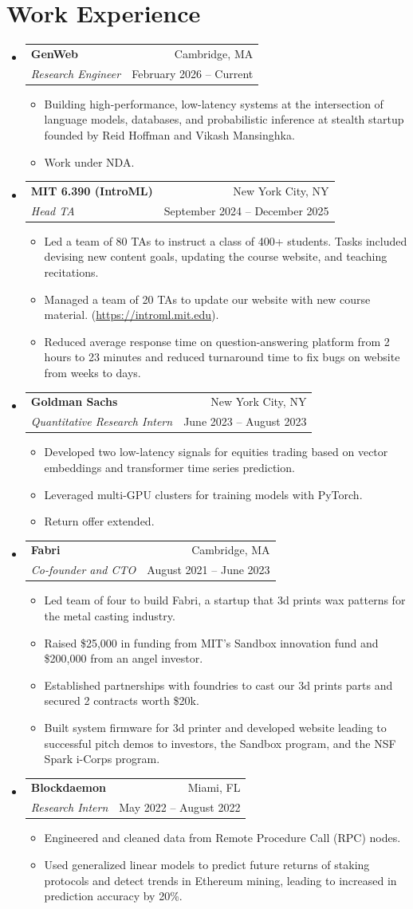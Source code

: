 \documentclass[letterpaper,10pt]{article} %
\makeatletter
\newcommand{\CVItem}[1]{
  \item\small{
    {#1 \vspace{-3pt}}
  }
}
\newcommand{\CVSubheading}[4]{
  \vspace{-2pt}\item
    \begin{tabular*}{0.97\textwidth}[t]{l@{\extracolsep{\fill}}r}
      \textbf{#1} & #2 \\
      \small#3 & \small #4 \\
    \end{tabular*}\vspace{-7pt}
}
\newcommand{\CVSubHeadingListStart}{\begin{itemize}[leftmargin=0.5cm, label={}]}
\newcommand{\CVSubHeadingListEnd}{\end{itemize}}
\newcommand{\CVItemListStart}{\begin{itemize}}
\newcommand{\CVItemListEnd}{\end{itemize}\vspace{-5pt}}
\makeatother
\begin{document}
\section{Work Experience}
  \CVSubHeadingListStart
    \CVSubheading
      {GenWeb}{Cambridge, MA}
      {\emph{Research Engineer}}{February 2026 -- Current}
      \CVItemListStart
        \CVItem{Building high-performance, low-latency systems at the intersection of language models, databases, and probabilistic inference at stealth startup founded by Reid Hoffman and Vikash Mansinghka.}
        \CVItem{Work under NDA.}
      \CVItemListEnd
    \CVSubheading
      {MIT 6.390 (IntroML)}{New York City, NY}
      {\emph{Head TA}}{September 2024 -- December 2025}
      \CVItemListStart
        \CVItem{Led a team of 80 TAs to instruct a class of 400+ students. Tasks included devising new content goals, updating the course website, and teaching recitations.}
        \CVItem{Managed a team of 20 TAs to update our website with new course material. (\href{https://introml.mit.edu}{https://introml.mit.edu}).}
        \CVItem{Reduced average response time on question-answering platform from 2 hours to 23 minutes and reduced turnaround time to fix bugs on website from weeks to days.}
    \CVItemListEnd
    \CVSubheading
      {Goldman Sachs}{New York City, NY}
      {\emph{Quantitative Research Intern}}{June 2023 -- August 2023}
      \CVItemListStart
        \CVItem{Developed two low-latency signals for equities trading based on vector embeddings and transformer time series prediction.}
        \CVItem{Leveraged multi-GPU clusters for training models with PyTorch.}
        \CVItem{Return offer extended.}
      \CVItemListEnd
    \CVSubheading
      {Fabri}{Cambridge, MA}
      {\emph{Co-founder and CTO}}{August 2021 -- June 2023}
      \CVItemListStart
        \CVItem{Led team of four to build Fabri, a startup that 3d prints wax patterns for the metal casting industry.}
        \CVItem{Raised  \$25,000 in funding from MIT's Sandbox innovation fund and \$200,000 from an angel investor.}
        \CVItem{Established partnerships with foundries to cast our 3d prints parts and secured 2 contracts worth \$20k.}
        \CVItem{Built system firmware for 3d printer and developed website leading to successful pitch demos to investors, the Sandbox program, and the NSF Spark i-Corps program.}
    \CVItemListEnd
    \CVSubheading
      {Blockdaemon}{Miami, FL}
      {\emph{Research Intern}}{May 2022 -- August 2022}
        \CVItemListStart
        \CVItem{Engineered and cleaned data from Remote Procedure Call (RPC) nodes.}
        \CVItem{Used generalized linear models to predict future returns of staking protocols and detect trends in Ethereum mining, leading to increased in prediction accuracy by 20\%.}
    \CVItemListEnd
  \CVSubHeadingListEnd
\end{document}

